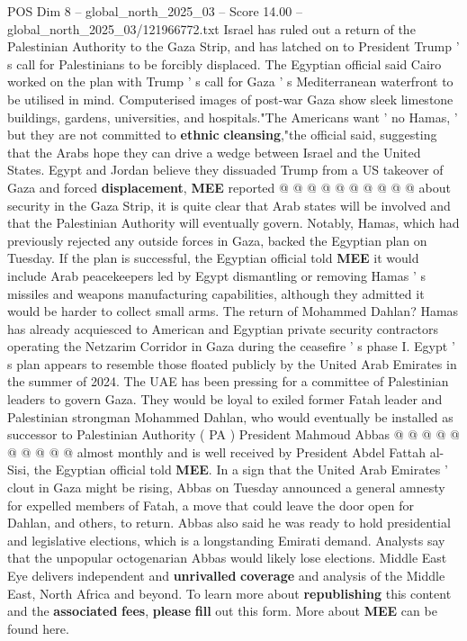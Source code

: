 \begin{textsample}{POS Dim 8 – global\_north\_2025\_03 – Score 14.00 – global\_north\_2025\_03/121966772.txt}
Israel has ruled out a return of the Palestinian Authority to the Gaza Strip, and has latched on to President Trump ' s call for Palestinians to be forcibly displaced.
The Egyptian official said Cairo worked on the plan with Trump ' s call for Gaza ' s Mediterranean waterfront to be utilised in mind.
Computerised images of post-war Gaza show sleek limestone buildings, gardens, universities, and hospitals."The Americans want ' no Hamas, ' but they are not committed to \textbf{ethnic} \textbf{cleansing},"the official said, suggesting that the Arabs hope they can drive a wedge between Israel and the United States.
Egypt and Jordan believe they dissuaded Trump from a US takeover of Gaza and forced \textbf{displacement}, \textbf{MEE} reported @ @ @ @ @ @ @ @ @ @ about security in the Gaza Strip, it is quite clear that Arab states will be involved and that the Palestinian Authority will eventually govern.
Notably, Hamas, which had previously rejected any outside forces in Gaza, backed the Egyptian plan on Tuesday.
If the plan is successful, the Egyptian official told \textbf{MEE} it would include Arab peacekeepers led by Egypt dismantling or removing Hamas ' s missiles and weapons manufacturing capabilities, although they admitted it would be harder to collect small arms.
The return of Mohammed Dahlan?
Hamas has already acquiesced to American and Egyptian private security contractors operating the Netzarim Corridor in Gaza during the ceasefire ' s phase I.
Egypt ' s plan appears to resemble those floated publicly by the United Arab Emirates in the summer of 2024.
The UAE has been pressing for a committee of Palestinian leaders to govern Gaza.
They would be loyal to exiled former Fatah leader and Palestinian strongman Mohammed Dahlan, who would eventually be installed as successor to Palestinian Authority ( PA ) President Mahmoud Abbas @ @ @ @ @ @ @ @ @ @ almost monthly and is well received by President Abdel Fattah al-Sisi, the Egyptian official told \textbf{MEE}.
In a sign that the United Arab Emirates ' clout in Gaza might be rising, Abbas on Tuesday announced a general amnesty for expelled members of Fatah, a move that could leave the door open for Dahlan, and others, to return.
Abbas also said he was ready to hold presidential and legislative elections, which is a longstanding Emirati demand.
Analysts say that the unpopular octogenarian Abbas would likely lose elections.
Middle East Eye delivers independent and \textbf{unrivalled} \textbf{coverage} and analysis of the Middle East, North Africa and beyond.
To learn more about \textbf{republishing} this content and the \textbf{associated} \textbf{fees}, \textbf{please} \textbf{fill} out this form.
More about \textbf{MEE} can be found here.

\end{textsample}
